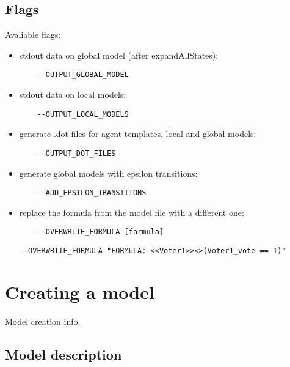 \documentclass[12pt]{article}
\begin{document}
\subsection{Flags}
Avaliable flags:
\begin{itemize}
  \item stdout data on global model (after expandAllStates):
  \begin{lstlisting}
    --OUTPUT_GLOBAL_MODEL
  \end{lstlisting}
  \item stdout data on local models:
  \begin{lstlisting}
    --OUTPUT_LOCAL_MODELS
  \end{lstlisting}
  \item generate .dot files for agent templates, local and global models:
  \begin{lstlisting}
    --OUTPUT_DOT_FILES 
  \end{lstlisting}
  \item generate global models with epsilon transitions:
  \begin{lstlisting}
    --ADD_EPSILON_TRANSITIONS
  \end{lstlisting}
  \item replace the formula from the model file with a different one:
  \begin{lstlisting}
    --OVERWRITE_FORMULA [formula]
  \end{lstlisting}
  \begin{lstlisting}[title={Example formula replacement with another one.}]
    --OVERWRITE_FORMULA "FORMULA: <<Voter1>><>(Voter1_vote == 1)"
  \end{lstlisting}
\end{itemize}

\section{Creating a model}
Model creation info.
\subsection{Model description}
\end{document}
